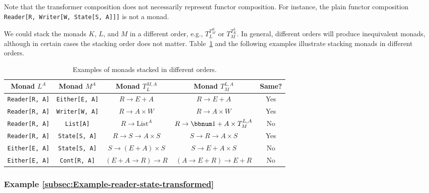 Note that the transformer composition does not necessarily represent
functor composition. For instance, the plain functor composition \lstinline!Reader[R, Writer[W, State[S, A]]]!
is not a monad.

We could stack the monads $K$, $L$, and $M$ in a different order,
e.g., $T_{L}^{T_{M}^{K}}$ or $T_{M}^{T_{K}^{L}}$. In general, different
orders will produce inequivalent monads, although in certain cases
the stacking order does not matter. Table~\ref{tab:Examples-of-monad-stacks}
and the following examples illustrate stacking monads in different
orders.

\begin{table}
\begin{centering}
\begin{tabular}{|c|c|c|c|c|}
\hline 
\textbf{\small{}Monad $L^{A}$} & \textbf{\small{}Monad $M^{A}$} & \textbf{\small{}Monad $T_{L}^{M,A}$} & \textbf{\small{}Monad $T_{M}^{L,A}$} & \textbf{\small{}Same?}\tabularnewline
\hline 
\hline 
{\small{}}\lstinline!Reader[R, A]! & {\small{}}\lstinline!Either[E, A]! & {\small{}$R\rightarrow E+A$} & {\small{}$R\rightarrow E+A$} & {\small{}Yes}\tabularnewline
\hline 
{\small{}}\lstinline!Reader[R, A]! & {\small{}}\lstinline!Writer[W, A]! & {\small{}$R\rightarrow A\times W$} & {\small{}$R\rightarrow A\times W$} & {\small{}Yes}\tabularnewline
\hline 
{\small{}}\lstinline!Reader[R, A]! & {\small{}}\lstinline!List[A]! & {\small{}$R\rightarrow\text{List}^{A}$} & {\small{}$R\rightarrow\bbnum 1+A\times T_{M}^{L,A}$} & {\small{}No}\tabularnewline
\hline 
{\small{}}\lstinline!Reader[R, A]! & {\small{}}\lstinline!State[S, A]! & {\small{}$R\rightarrow S\rightarrow A\times S$} & {\small{}$S\rightarrow R\rightarrow A\times S$} & {\small{}Yes}\tabularnewline
\hline 
{\small{}}\lstinline!Either[E, A]! & {\small{}}\lstinline!State[S, A]! & {\small{}$S\rightarrow(E+A)\times S$} & {\small{}$S\rightarrow E+A\times S$} & {\small{}No}\tabularnewline
\hline 
{\small{}}\lstinline!Either[E, A]! & {\small{}}\lstinline!Cont[R, A]! & {\small{}$\left(E+A\rightarrow R\right)\rightarrow R$} & {\small{}$\left(A\rightarrow E+R\right)\rightarrow E+R$} & {\small{}No}\tabularnewline
\hline 
\end{tabular}
\par\end{centering}
\caption{\label{tab:Examples-of-monad-stacks}Examples of monads stacked in
different orders.}
\end{table}


\subsubsection{Example \label{subsec:Example-reader-state-transformed}\ref{subsec:Example-reader-state-transformed}}

